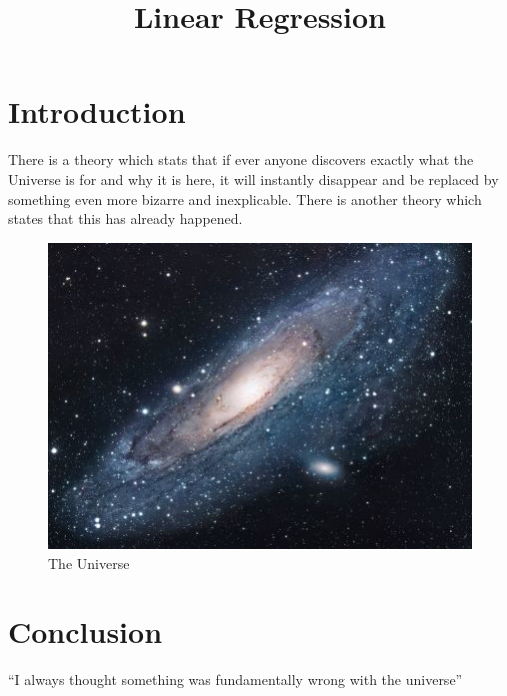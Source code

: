 \documentclass{article}
\title{Linear Regression}
\date{}
\begin{document}
\section{Introduction}
There is a theory which stats that if ever anyone discovers exactly what the Universe is for and why it is here, it will instantly disappear and be replaced by something even more bizarre and inexplicable.
There is another theory which states that this has already happened.

\begin{figure}[h!]
\centering
\includegraphics[scale=1.7]{universe}
\caption{The Universe}
\label{fig:universe}
\end{figure}

\section{Conclusion}
``I always thought something was fundamentally wrong with the universe'' \citep{adams1995hitchhiker}



\end{document}
